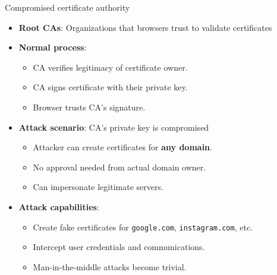 \ifdefined\PRESENTATION\else\PassOptionsToClass{handout}{beamer}\fi\documentclass[aspectratio=169, lualatex]{beamer}
\begin{document}
\begin{frame}{Compromised certificate authority}
	\begin{itemize}[<+->]
		\item \textbf{Root CAs}: Organizations that browsers trust to validate certificates
		\item \textbf{Normal process}:
		      \begin{itemize}
			      \item CA verifies legitimacy of certificate owner.
			      \item CA signs certificate with their private key.
			      \item Browser trusts CA's signature.
		      \end{itemize}
		\item \textbf{Attack scenario}: CA's private key is compromised
		      \begin{itemize}
			      \item Attacker can create certificates for \textbf{any domain}.
			      \item No approval needed from actual domain owner.
			      \item Can impersonate legitimate servers.
		      \end{itemize}
		\item \textbf{Attack capabilities}:
		      \begin{itemize}
			      \item Create fake certificates for \texttt{google.com}, \texttt{instagram.com}, etc.
			      \item Intercept user credentials and communications.
			      \item Man-in-the-middle attacks become trivial.
		      \end{itemize}
	\end{itemize}
\end{frame}
\end{document}
